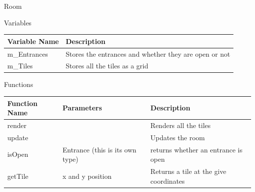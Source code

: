 \documentclass[../../Main.tex]{subfiles}
\begin{document}
    Room
    \begin{center}
        Variables
        \begin{tabular}{ | m{} | m{} | }
            \hline
            \textbf{Variable Name} & \textbf{Description} \\
            \hline
            m\_Entrances & Stores the entrances and whether they are open or not\\
            \hline
            m\_Tiles & Stores all the tiles as a grid \\
            \hline
        \end{tabular}
        Functions
        \begin{tabular}{ | m{} | m{}| m{} | }
            \hline
            \textbf{Function Name} & \textbf{Parameters} & \textbf{Description} \\
            \hline
            render & & Renders all the tiles \\
            \hline
            update & & Updates the room \\
            \hline
            isOpen & Entrance (this is its own type) & returns whether an entrance is open \\
            \hline
            getTile & x and y position & Returns a tile at the give coordinates \\
            \hline
        \end{tabular}
    \end{center}
\end{document}
